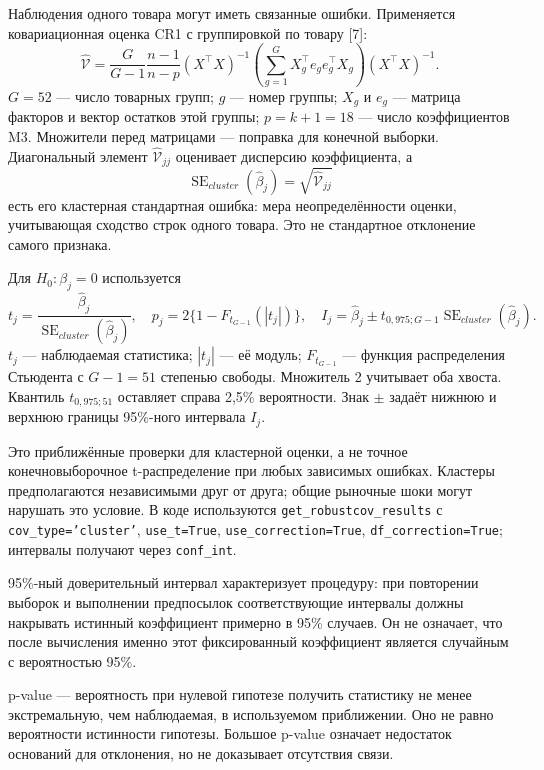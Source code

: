\documentclass[14pt,a4paper]{extreport}
\begin{document}
Наблюдения одного товара могут иметь связанные ошибки. Применяется ковариационная оценка CR1 с группировкой по товару [7]:
\begin{equation}
 \widehat{\mathcal V}=\frac{G}{G-1}\frac{n-1}{n-p}
 (X^\top X)^{-1}\left(\sum_{g=1}^{G}X_g^\top e_g e_g^\top X_g\right)(X^\top X)^{-1}.
\end{equation}
$G=52$ --- число товарных групп; $g$ --- номер группы; $X_g$ и $e_g$ --- матрица факторов и вектор остатков этой группы; $p=k+1=18$ --- число коэффициентов M3. Множители перед матрицами --- поправка для конечной выборки. Диагональный элемент $\widehat{\mathcal V}_{jj}$ оценивает дисперсию коэффициента, а
\begin{equation}
 \operatorname{SE}_{cluster}(\widehat\beta_j)=\sqrt{\widehat{\mathcal V}_{jj}}
\end{equation}
есть его кластерная стандартная ошибка: мера неопределённости оценки, учитывающая сходство строк одного товара. Это не стандартное отклонение самого признака.

Для $H_0:\beta_j=0$ используется
\begin{equation}
 t_j=\frac{\widehat\beta_j}{\operatorname{SE}_{cluster}(\widehat\beta_j)},\quad
 p_j=2\{1-F_{t_{G-1}}(|t_j|)\},\quad
 I_j=\widehat\beta_j\pm t_{0{,}975;G-1}\operatorname{SE}_{cluster}(\widehat\beta_j).
\end{equation}
$t_j$ --- наблюдаемая статистика; $|t_j|$ --- её модуль; $F_{t_{G-1}}$ --- функция распределения Стьюдента с $G-1=51$ степенью свободы. Множитель 2 учитывает оба хвоста. Квантиль $t_{0{,}975;51}$ оставляет справа 2,5\% вероятности. Знак $\pm$ задаёт нижнюю и верхнюю границы 95\%-ного интервала $I_j$.

Это приближённые проверки для кластерной оценки, а не точное конечновыборочное t-распределение при любых зависимых ошибках. Кластеры предполагаются независимыми друг от друга; общие рыночные шоки могут нарушать это условие. В коде используются \texttt{get\_robustcov\_results} с \texttt{cov\_type='cluster'}, \texttt{use\_t=True}, \texttt{use\_correction=True}, \texttt{df\_correction=True}; интервалы получают через \texttt{conf\_int}.

95\%-ный доверительный интервал характеризует процедуру: при повторении выборок и выполнении предпосылок соответствующие интервалы должны накрывать истинный коэффициент примерно в 95\% случаев. Он не означает, что после вычисления именно этот фиксированный коэффициент является случайным с вероятностью 95\%.

p-value --- вероятность при нулевой гипотезе получить статистику не менее экстремальную, чем наблюдаемая, в используемом приближении. Оно не равно вероятности истинности гипотезы. Большое p-value означает недостаток оснований для отклонения, но не доказывает отсутствия связи.
\end{document}
